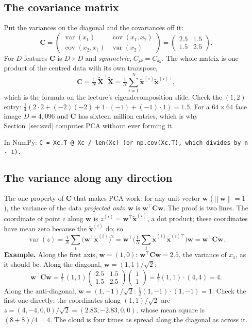 \documentclass[11pt]{article}
\newcommand{\vx}{\bm{x}}
\newcommand{\vw}{\bm{w}}
\newcommand{\mX}{\bm{X}}
\newcommand{\mC}{\bm{C}}
\newcommand{\norm}[1]{\left\lVert #1 \right\rVert}
\newcommand{\np}[1]{{\small\color{lightgray}In NumPy: \texttt{#1}}\par}
\begin{document}
\subsection{The covariance matrix}
\label{sec:cov}

Put the variances on the diagonal and the covariances off it:
\[
\mC = \begin{pmatrix} \operatorname{var}(x_1) & \operatorname{cov}(x_1,x_2) \\ \operatorname{cov}(x_2,x_1) & \operatorname{var}(x_2) \end{pmatrix}
= \begin{pmatrix} 2.5 & 1.5 \\ 1.5 & 2.5 \end{pmatrix}.
\]
For $D$ features $\mC$ is $D\times D$ and \emph{symmetric}, $C_{jk} = C_{kj}$. The whole
matrix is one product of the centred data with its own transpose,
\[
\mC = \tfrac{1}{N}\,\tilde{\mX}^{\top}\tilde{\mX} = \tfrac{1}{N}\sum_{i=1}^{N}\tilde{\vx}^{(i)}\tilde{\vx}^{(i)\top},
\]
which is the formula on the lecture's eigendecomposition slide. Check the $(1,2)$ entry:
$\tfrac{1}{4}(2\cdot2 + (-2)(-2) + 1\cdot(-1) + (-1)\cdot1) = 1.5$. For a $64\times64$ face
image $D = 4{,}096$ and $\mC$ has sixteen million entries, which is why
Section~\ref{sec:svd} computes PCA without ever forming it.

\np{C = Xc.T @ Xc / len(Xc)  (or np.cov(Xc.T), which divides by n - 1).}

\subsection{The variance along any direction}
\label{sec:quadratic}

The one property of $\mC$ that makes PCA work: for any unit vector $\vw$ ($\norm{\vw} =
1$), the variance of the data \emph{projected onto} $\vw$ is $\vw^{\top}\mC\vw$. The proof
is two lines. The coordinate of point $i$ along $\vw$ is $z^{(i)} = \vw^{\top}\tilde{\vx}^{(i)}$,
a dot product; these coordinates have mean zero because the $\tilde{\vx}^{(i)}$ do; so
\[
\operatorname{var}(z) = \tfrac{1}{N}\sum_i \big(\vw^{\top}\tilde{\vx}^{(i)}\big)^2
= \vw^{\top}\Big(\tfrac{1}{N}\sum_i \tilde{\vx}^{(i)}\tilde{\vx}^{(i)\top}\Big)\vw
= \vw^{\top}\mC\vw .
\]
\textbf{Example.} Along the first axis, $\vw = (1, 0)$: $\vw^{\top}\mC\vw = 2.5$, the
variance of $x_1$, as it should be. Along the diagonal, $\vw = (1, 1)/\sqrt{2}$:
\[
\vw^{\top}\mC\vw = \tfrac{1}{2}\,(1, 1)\begin{pmatrix} 2.5 & 1.5 \\ 1.5 & 2.5 \end{pmatrix}\begin{pmatrix}1\\1\end{pmatrix}
= \tfrac{1}{2}(1, 1)\cdot(4, 4) = 4 .
\]
Along the anti-diagonal, $\vw = (1, -1)/\sqrt{2}$: $\tfrac{1}{2}(1,-1)\cdot(1,-1) = 1$.
Check the first one directly: the coordinates along $(1,1)/\sqrt 2$ are
$z = (4, -4, 0, 0)/\sqrt{2} = (2.83, -2.83, 0, 0)$, whose mean square is $(8 + 8)/4 = 4$.
The cloud is four times as spread along the diagonal as across it.
\end{document}
